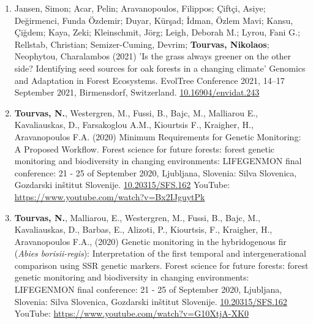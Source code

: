\documentclass[12pt,]{scrartcl}
\begin{document}
\vspace{-3mm}
\begin{enumerate}
\leftskip-0.13in
	\setcounter{enumi}{3}
	
\leftskip-0.07in  

\leftskip-0.07in  

\item Jansen, Simon; Acar, Pelin; Aravanopoulos, Filippos; Çiftçi, Asiye; Değirmenci, Funda Özdemir; Duyar, Kürşad; İdman, Özlem Mavi; Kansu, Çiğdem; Kaya, 
Zeki; Kleinschmit, Jörg; Leigh, Deborah M.; Lyrou, Fani G.; Rellstab, Christian; 
Semizer-Cuming, Devrim; \textbf{Tourvas, Nikolaos}; Neophytou, Charalambos (2021) 'Is the grass always greener on the other side? Identifying seed sources for oak forests in a changing climate' Genomics and Adaptation in Forest Ecosystems. EvolTree Conference 2021, 14–17 September 2021, Birmensdorf, Switzerland. \href{http://doi.org/10.16904/envidat.243}{10.16904/envidat.243}

\item \textbf{Tourvas, N.}, Westergren, M., Fussi,  B.,  Bajc,  M.,  Malliarou  E.,  Kavaliauskas,  D.,  Farsakoglou A.M., Kiourtsis F., Kraigher, H., Aravanopoulos F.A. (2020) Minimum Requirements for Genetic Monitoring: A Proposed Workflow. Forest science for future forests: forest genetic monitoring and biodiversity in changing environments: LIFEGENMON final conference: 21 - 25 of September 2020, Ljubljana, Slovenia: Silva Slovenica, Gozdarski inštitut Slovenije. 
\href{http://doi.org/10.20315/SFS.162}{10.20315/SFS.162}
\newline
YouTube: \href{https://www.youtube.com/watch?v=Bx2IJguytPk}{https://www.youtube.com/watch?v=Bx2IJguytPk}

\item \textbf{Tourvas, N.}, Malliarou, E., Westergren, M., Fussi, B., Bajc, M., Kavaliauskas, D., Barbas, E., Alizoti, P., Kiourtsis, F., Kraigher, H., Aravanopoulos F.A., (2020) Genetic monitoring in the hybridogenous fir (\textit{Abies borisii-regis}): Interpretation of the first temporal and intergenerational comparison using SSR genetic markers. Forest science for future forests: forest genetic monitoring and biodiversity in changing environments: LIFEGENMON final conference: 21 - 25 of September 2020, Ljubljana, Slovenia: Silva Slovenica, Gozdarski inštitut Slovenije. \href{http://doi.org/10.20315/SFS.162}{10.20315/SFS.162}
\newline
YouTube: \href{https://www.youtube.com/watch?v=G10XtjA-XK0}{https://www.youtube.com/watch?v=G10XtjA-XK0}


\end{enumerate}
\end{document}
